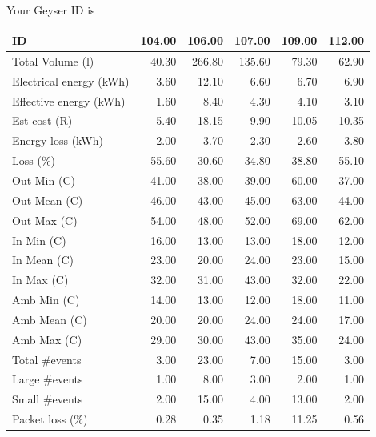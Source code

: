 \documentclass{article}\usepackage[]{graphicx}\usepackage[]{color}
\newenvironment{knitrout}{}{} %
\begin{document}
Your Geyser ID is  \\




\begin{center}
\begin{knitrout}
\color{fgcolor}
\begin{tabular}{l|r|r|r|r|r}
\hline
ID & 104.00 & 106.00 & 107.00 & 109.00 & 112.00\\
\hline
Total Volume (l) & 40.30 & 266.80 & 135.60 & 79.30 & 62.90\\
\hline
Electrical energy (kWh) & 3.60 & 12.10 & 6.60 & 6.70 & 6.90\\
\hline
Effective energy (kWh) & 1.60 & 8.40 & 4.30 & 4.10 & 3.10\\
\hline
Est cost (R) & 5.40 & 18.15 & 9.90 & 10.05 & 10.35\\
\hline
Energy loss (kWh) & 2.00 & 3.70 & 2.30 & 2.60 & 3.80\\
\hline
Loss (\%) & 55.60 & 30.60 & 34.80 & 38.80 & 55.10\\
\hline
Out Min (C) & 41.00 & 38.00 & 39.00 & 60.00 & 37.00\\
\hline
Out Mean (C) & 46.00 & 43.00 & 45.00 & 63.00 & 44.00\\
\hline
Out Max (C) & 54.00 & 48.00 & 52.00 & 69.00 & 62.00\\
\hline
In Min (C) & 16.00 & 13.00 & 13.00 & 18.00 & 12.00\\
\hline
In Mean (C) & 23.00 & 20.00 & 24.00 & 23.00 & 15.00\\
\hline
In Max (C) & 32.00 & 31.00 & 43.00 & 32.00 & 22.00\\
\hline
Amb Min (C) & 14.00 & 13.00 & 12.00 & 18.00 & 11.00\\
\hline
Amb Mean (C) & 20.00 & 20.00 & 24.00 & 24.00 & 17.00\\
\hline
Amb Max (C) & 29.00 & 30.00 & 43.00 & 35.00 & 24.00\\
\hline
Total \#events & 3.00 & 23.00 & 7.00 & 15.00 & 3.00\\
\hline
Large \#events & 1.00 & 8.00 & 3.00 & 2.00 & 1.00\\
\hline
Small \#events & 2.00 & 15.00 & 4.00 & 13.00 & 2.00\\
\hline
Packet loss (\%) & 0.28 & 0.35 & 1.18 & 11.25 & 0.56\\
\hline
\end{tabular}


\end{knitrout}
\end{center}
\end{document}
